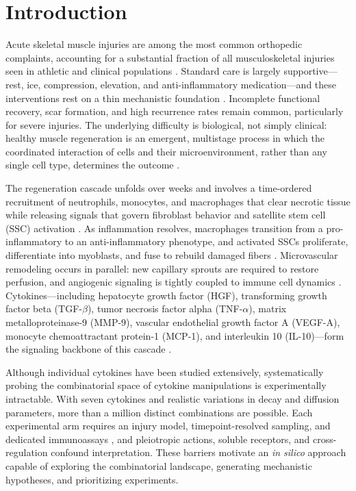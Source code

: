 \section{Introduction}

Acute skeletal muscle injuries are among the most common orthopedic complaints, accounting for a substantial fraction of all musculoskeletal injuries seen in athletic and clinical populations \cite{maffulli2014muscle}. Standard care is largely supportive---rest, ice, compression, elevation, and anti-inflammatory medication---and these interventions rest on a thin mechanistic foundation \cite{deyhle2018role}. Incomplete functional recovery, scar formation, and high recurrence rates remain common, particularly for severe injuries. The underlying difficulty is biological, not simply clinical: healthy muscle regeneration is an emergent, multistage process in which the coordinated interaction of cells and their microenvironment, rather than any single cell type, determines the outcome \cite{forcina2020mechanisms,chazaud2020inflammation}.

The regeneration cascade unfolds over weeks and involves a time-ordered recruitment of neutrophils, monocytes, and macrophages that clear necrotic tissue while releasing signals that govern fibroblast behavior and satellite stem cell (SSC) activation \cite{tidball2017regulation,dumont2015satellite}. As inflammation resolves, macrophages transition from a pro-inflammatory to an anti-inflammatory phenotype, and activated SSCs proliferate, differentiate into myoblasts, and fuse to rebuild damaged fibers \cite{arnold2007inflammatory,bentzinger2013cellular}. Microvascular remodeling occurs in parallel: new capillary sprouts are required to restore perfusion, and angiogenic signaling is tightly coupled to immune cell dynamics \cite{carmeliet2003angiogenesis}. Cytokines---including hepatocyte growth factor (HGF), transforming growth factor beta (TGF-$\beta$), tumor necrosis factor alpha (TNF-$\alpha$), matrix metalloproteinase-9 (MMP-9), vascular endothelial growth factor A (VEGF-A), monocyte chemoattractant protein-1 (MCP-1), and interleukin 10 (IL-10)---form the signaling backbone of this cascade \cite{tatsumi1998hgf,lu2011macrophages}.

Although individual cytokines have been studied extensively, systematically probing the combinatorial space of cytokine manipulations is experimentally intractable. With seven cytokines and realistic variations in decay and diffusion parameters, more than a million distinct combinations are possible. Each experimental arm requires an injury model, timepoint-resolved sampling, and dedicated immunoassays \cite{wehling2009interleukin}, and pleiotropic actions, soluble receptors, and cross-regulation confound interpretation. These barriers motivate an \emph{in silico} approach capable of exploring the combinatorial landscape, generating mechanistic hypotheses, and prioritizing experiments.

